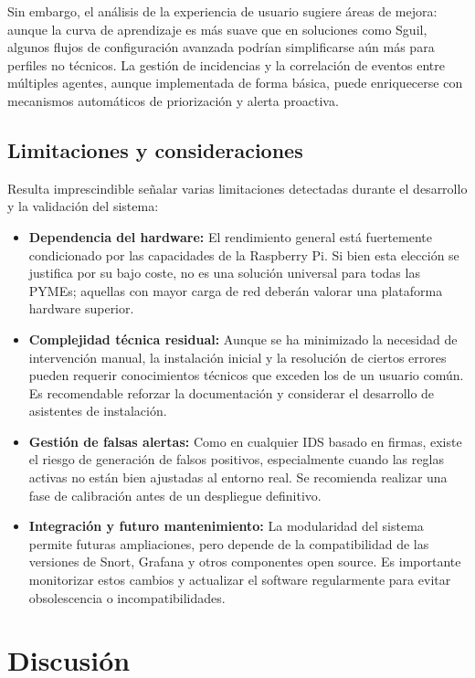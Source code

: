 \documentclass[11pt,a4paper,twoside]{report}
\begin{document}
Sin embargo, el análisis de la experiencia de usuario sugiere áreas de mejora: aunque la curva de aprendizaje es más suave que en soluciones como Sguil, algunos flujos de configuración avanzada podrían simplificarse aún más para perfiles no técnicos. La gestión de incidencias y la correlación de eventos entre múltiples agentes, aunque implementada de forma básica, puede enriquecerse con mecanismos automáticos de priorización y alerta proactiva.

\subsection{Limitaciones y consideraciones}

Resulta imprescindible señalar varias limitaciones detectadas durante el desarrollo y la validación del sistema:

\begin{itemize}
	\item \textbf{Dependencia del hardware:} El rendimiento general está fuertemente condicionado por las capacidades de la Raspberry Pi. Si bien esta elección se justifica por su bajo coste, no es una solución universal para todas las PYMEs; aquellas con mayor carga de red deberán valorar una plataforma hardware superior.
	\item \textbf{Complejidad técnica residual:} Aunque se ha minimizado la necesidad de intervención manual, la instalación inicial y la resolución de ciertos errores pueden requerir conocimientos técnicos que exceden los de un usuario común. Es recomendable reforzar la documentación y considerar el desarrollo de asistentes de instalación.
	\item \textbf{Gestión de falsas alertas:} Como en cualquier IDS basado en firmas, existe el riesgo de generación de falsos positivos, especialmente cuando las reglas activas no están bien ajustadas al entorno real. Se recomienda realizar una fase de calibración antes de un despliegue definitivo.
	\item \textbf{Integración y futuro mantenimiento:} La modularidad del sistema permite futuras ampliaciones, pero depende de la compatibilidad de las versiones de Snort, Grafana y otros componentes open source. Es importante monitorizar estos cambios y actualizar el software regularmente para evitar obsolescencia o incompatibilidades.
\end{itemize}

\section{Discusión}
\end{document}
